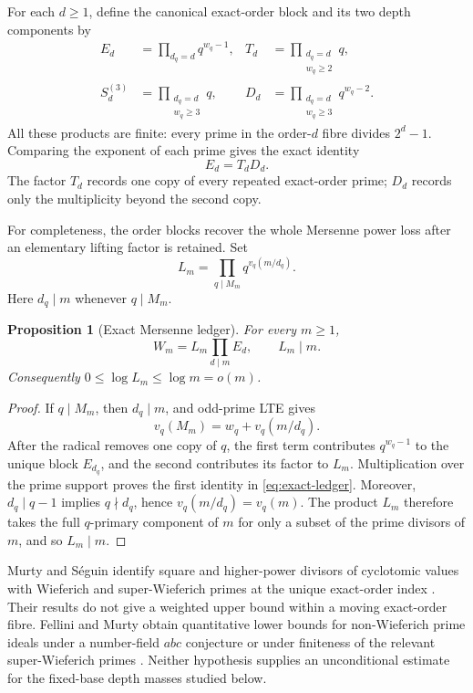 \documentclass[11pt]{article}
\newtheorem{proposition}[theorem]{Proposition}
\theoremstyle{remark}
\begin{document}
For each $d\ge1$, define the canonical exact-order block and its two depth
components by
\begin{align}
 E_d&=\prod_{d_q=d}q^{w_q-1},
 &T_d&=\prod_{\substack{d_q=d\\w_q\ge2}}q,
 \label{eq:E-T}\\
 S_d^{(3)}&=\prod_{\substack{d_q=d\\w_q\ge3}}q,
 &D_d&=\prod_{\substack{d_q=d\\w_q\ge3}}q^{w_q-2}.
 \label{eq:S-D}
\end{align}
All these products are finite: every prime in the order-$d$ fibre divides
$2^d-1$.  Comparing the exponent of each prime gives the exact identity
\begin{equation}
                         E_d=T_dD_d.
  \label{eq:E-split}
\end{equation}
The factor $T_d$ records one copy of every repeated exact-order prime;
$D_d$ records only the multiplicity beyond the second copy.

For completeness, the order blocks recover the whole Mersenne power loss
after an elementary lifting factor is retained.  Set
\begin{equation}
  L_m=\prod_{q\mid M_m}q^{v_q(m/d_q)}.
  \label{eq:lifting-factor}
\end{equation}
Here $d_q\mid m$ whenever $q\mid M_m$.

\begin{proposition}[Exact Mersenne ledger]
\label{prop:ledger}
For every $m\ge1$,
\begin{equation}
  W_m=L_m\prod_{d\mid m}E_d,
  \qquad L_m\mid m.
  \label{eq:exact-ledger}
\end{equation}
Consequently $0\le\log L_m\le\log m=o(m)$.
\end{proposition}

\begin{proof}
If $q\mid M_m$, then $d_q\mid m$, and odd-prime LTE gives
\[
 v_q(M_m)=w_q+v_q(m/d_q).
\]
After the radical removes one copy of $q$, the first term contributes
$q^{w_q-1}$ to the unique block $E_{d_q}$, and the second contributes its
factor to $L_m$.  Multiplication over the prime support proves the first
identity in \eqref{eq:exact-ledger}.  Moreover, $d_q\mid q-1$ implies
$q\nmid d_q$, hence $v_q(m/d_q)=v_q(m)$.  The product $L_m$ therefore takes
the full $q$-primary component of $m$ for only a subset of the prime
divisors of $m$, and so $L_m\mid m$.
\end{proof}

Murty and S\'eguin identify square and higher-power divisors of cyclotomic
values with Wieferich and super-Wieferich primes at the unique exact-order
index \cite[Lemmas~4.2--4.3]{MurtySeguin2019}.  Their results do not give a
weighted upper bound within a moving exact-order fibre.  Fellini and Murty
obtain quantitative lower bounds for non-Wieferich prime ideals under a
number-field $abc$ conjecture or under finiteness of the relevant
super-Wieferich primes \cite[Theorems~1.2--1.4]{FelliniMurty2026}.  Neither
hypothesis supplies an unconditional estimate for the fixed-base depth
masses studied below.
\end{document}

